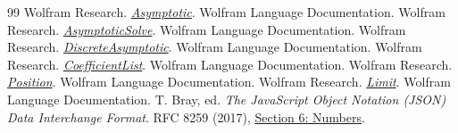 \documentclass[11pt,a4paper]{article}
\begin{document}
\begin{thebibliography}{99}
 Wolfram Research. \href{https://reference.wolfram.com/language/ref/Asymptotic.html}{\textit{Asymptotic}}. Wolfram Language Documentation.
 Wolfram Research. \href{https://reference.wolfram.com/language/ref/AsymptoticSolve.html}{\textit{AsymptoticSolve}}. Wolfram Language Documentation.
 Wolfram Research. \href{https://reference.wolfram.com/language/ref/DiscreteAsymptotic.html}{\textit{DiscreteAsymptotic}}. Wolfram Language Documentation.
 Wolfram Research. \href{https://reference.wolfram.com/language/ref/CoefficientList.html}{\textit{CoefficientList}}. Wolfram Language Documentation.
 Wolfram Research. \href{https://reference.wolfram.com/language/ref/Position.html}{\textit{Position}}. Wolfram Language Documentation.
 Wolfram Research. \href{https://reference.wolfram.com/language/ref/Limit.html}{\textit{Limit}}. Wolfram Language Documentation.
 T. Bray, ed. \textit{The JavaScript Object Notation (JSON) Data Interchange Format}. RFC 8259 (2017), \href{https://www.rfc-editor.org/rfc/rfc8259.html#section-6}{Section 6: Numbers}.
\end{thebibliography}
\end{document}
